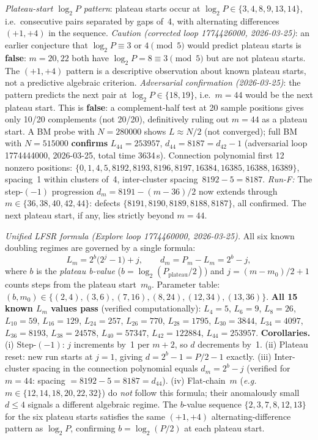 \documentclass[11pt]{article}
\theoremstyle{plain}
\theoremstyle{definition}
\begin{document}
\emph{Plateau-start $\log_2 P$ pattern}: plateau starts occur at $\log_2 P \in
\{3,4,8,9,13,14\}$, i.e.\ consecutive pairs separated by gaps of~4, with
alternating differences $(+1,+4)$ in the sequence.
\emph{Caution (corrected loop 1774426000, 2026-03-25)}: an earlier conjecture that
$\log_2 P \equiv 3$ or $4\pmod{5}$ would predict plateau starts is \textbf{false}:
$m=20,22$ both have $\log_2 P = 8 \equiv 3\pmod{5}$ but are not plateau starts.
The $(+1,+4)$ pattern is a descriptive observation about known plateau starts,
not a predictive algebraic criterion.
\emph{Adversarial confirmation (2026-03-25)}: the pattern predicts the next pair at
$\log_2 P\in\{18,19\}$, i.e.\ $m=44$ would be the next plateau start.  This is
\textbf{false}: a complement-half test at 20 sample positions gives only 10/20
complements (not 20/20), definitively ruling out $m=44$ as a plateau start.
A BM probe with $N=280000$ shows $L\approx N/2$ (not converged); full BM with $N=515000$
\textbf{confirms} $L_{44}=253957$, $d_{44}=8187=d_{42}-1$ (adversarial loop 1774444000,
2026-03-25, total time 3634\,s).
Connection polynomial first 12 nonzero positions: $\{0,1,4,5,8192,8193,8196,8197,16384,16385,
16388,16389\}$, spacing~1 within clusters of~4, inter-cluster spacing~$8192-5=8187$.
\emph{Run-F:} The step-$(-1)$ progression $d_m=8191-(m-36)/2$ now extends through
$m\in\{36,38,40,42,44\}$: defects $\{8191,8190,8189,8188,8187\}$, all confirmed.
The next plateau start, if any, lies strictly beyond $m=44$.

\emph{Unified LFSR formula (Explore loop 1774460000, 2026-03-25).}
All six known doubling regimes are governed by a single formula:
\[
  L_m = 2^b\bigl(2^j - 1\bigr) + j,
  \qquad
  d_m = P_m - L_m = 2^b - j,
\]
where $b$ is the \emph{plateau b-value} ($b = \log_2(P_{\mathrm{plateau}}/2)$)
and $j = (m - m_0)/2 + 1$ counts steps from the plateau start~$m_0$.
Parameter table: $(b, m_0) \in \{(2,4),(3,6),(7,16),(8,24),(12,34),(13,36)\}$.
\textbf{All 15 known $L_m$ values pass} (verified computationally):
$L_4=5$, $L_6=9$, $L_8=26$, $L_{10}=59$,
$L_{16}=129$,
$L_{24}=257$, $L_{26}=770$, $L_{28}=1795$, $L_{30}=3844$,
$L_{34}=4097$,
$L_{36}=8193$, $L_{38}=24578$, $L_{40}=57347$, $L_{42}=122884$, $L_{44}=253957$.
\textbf{Corollaries.}
(i) Step-$(-1)$: $j$ increments by~1 per $m\!+\!2$, so $d$ decrements by~1.
(ii) Plateau reset: new run starts at $j=1$, giving $d = 2^b-1 = P/2-1$ exactly.
(iii) Inter-cluster spacing in the connection polynomial equals $d_m = 2^b - j$
(verified for $m=44$: spacing $= 8192-5 = 8187 = d_{44}$).
(iv) Flat-chain~$m$ (\emph{e.g.}\ $m\in\{12,14,18,20,22,32\}$) do \emph{not} follow
this formula; their anomalously small $d\le 4$ signals a different algebraic regime.
The $b$-value sequence $\{2,3,7,8,12,13\}$ for the six plateau starts satisfies the
same $(+1,+4)$ alternating-difference pattern as $\log_2 P$, confirming
$b = \log_2(P/2)$ at each plateau start.
\end{document}
